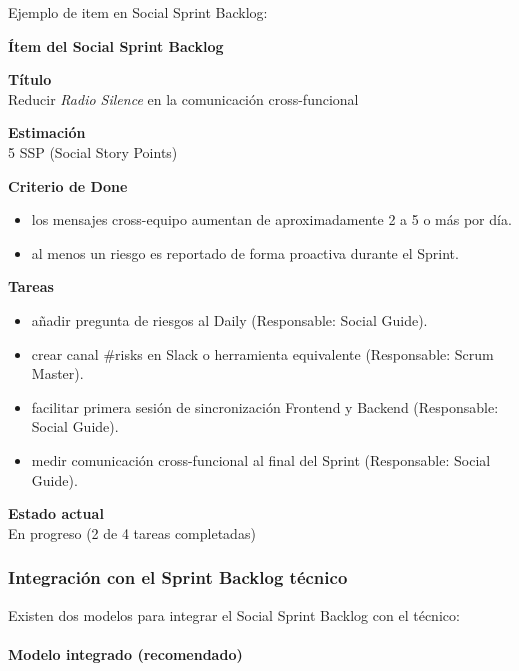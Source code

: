 Ejemplo de item en Social Sprint Backlog:

\begin{protocolo}
    \textbf{Ítem del Social Sprint Backlog}

    \textbf{Título}\\
    Reducir \emph{Radio Silence} en la comunicación cross-funcional

    \medskip
    \textbf{Estimación}\\
    5 SSP (Social Story Points)

    \medskip
    \textbf{Criterio de Done}
    \begin{itemize}
        \item los mensajes cross-equipo aumentan de aproximadamente 2 a 5 o más por día.
        \item al menos un riesgo es reportado de forma proactiva durante el Sprint.
    \end{itemize}

    \medskip
    \textbf{Tareas}
    \begin{itemize}
        \item añadir pregunta de riesgos al Daily \hfill (Responsable: Social Guide).
        \item crear canal \#risks en Slack o herramienta equivalente \hfill (Responsable: Scrum Master).
        \item facilitar primera sesión de sincronización Frontend y Backend \hfill (Responsable: Social Guide).
        \item medir comunicación cross-funcional al final del Sprint \hfill (Responsable: Social Guide).
    \end{itemize}

    \medskip
    \textbf{Estado actual}\\
    En progreso (2 de 4 tareas completadas)

\end{protocolo}

\subsubsection{Integración con el Sprint Backlog técnico}

Existen dos modelos para integrar el Social Sprint Backlog con el técnico:

\paragraph{Modelo integrado (recomendado)}


